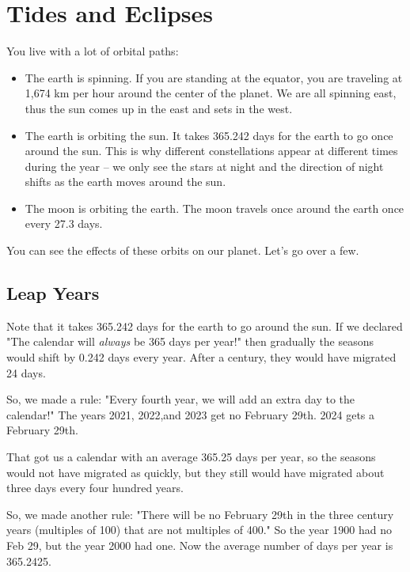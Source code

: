 \chapter{Tides and Eclipses}

You live with a lot of orbital paths:
\begin{itemize}

\item The earth is spinning.  If you are standing at the equator,  you are traveling at 1,674 km per hour around the center of the planet.  We are all spinning east,  thus the sun comes up in the east and sets in the west.

\item  The earth is orbiting the sun.    It takes 365.242 days for the earth to go once around the sun.  This is why different constellations appear at different times during the year -- we only see the stars at night and the direction of night shifts as the earth moves around the sun.  

\item The moon is orbiting the earth.   The moon travels once around the earth once every 27.3 days.  

\end{itemize}

You can see the effects of these orbits on our planet.  Let's go over a few.

\section{Leap Years}

Note that it takes 365.242 days for the earth to go around the sun.  If we declared "The calendar will \emph{always} be 365 days per year!"  then gradually the seasons would shift by 0.242 days every year.  After a century,  they would have migrated 24 days.

So, we made a rule: "Every fourth year,  we will add an extra day to the calendar!"  The years 2021, 2022,and 2023 get no February 29th.  2024 gets a February 29th.

That got us a calendar with an average 365.25 days per year, so the seasons would not have migrated as quickly,  but they still would have migrated about three days every four hundred years.

So, we made another rule: "There will be no February 29th in the three century years (multiples of 100) that are not multiples of 400."  So the year 1900 had no Feb 29,  but the year 2000 had one.   Now the average number of days per year is 365.2425.

